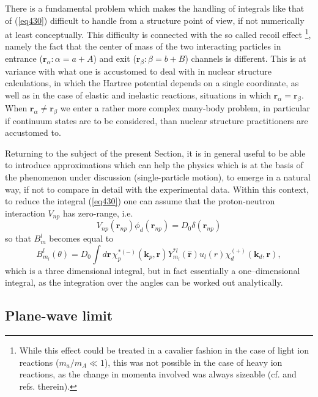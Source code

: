 There is a fundamental problem which makes the handling of integrals like that of (\ref{eq430}) difficult to handle from a structure point of view, if not numerically at least conceptually. This difficulty is connected with the so called recoil effect \footnote{While this effect could be treated in a cavalier fashion in the case of light ion reactions ($m_a/m_A\ll 1$), this was not possible in the case of heavy ion reactions, as the change in momenta involved was always sizeable (cf. \citet{Broglia:04a} and refs. therein).}, namely the fact that the center of mass of the two interacting particles in entrance ($\mathbf r_{\alpha}: \alpha=a+A$) and exit  ($\mathbf r_{\beta}: \beta=b+B$) channels is different. This is at variance with what one is accustomed to deal with in nuclear structure calculations, in which the Hartree potential depends on a single coordinate, as well as in the case of elastic and inelastic reactions, situations in which $\mathbf r_{\alpha}=\mathbf r_{\beta}$. When $\mathbf r_{\alpha}\neq\mathbf r_{\beta}$ we enter a rather more complex many-body problem, in particular if continuum states are to be considered, than nuclear structure practitioners are accustomed to.
 
 

 
 
 Returning to the subject of the present Section, it is in general useful to be able to introduce approximations which can help the physics which is at the basis of the phenomenon under discussion (single-particle motion), to emerge in a natural way, if not to compare in detail with the experimental data. 
Within this context, to reduce the integral (\ref{eq430}) one can assume that the proton-neutron interaction $V_{np}$ has zero-range, i.e.
\begin{equation}\label{eqC6AppE15}
 V_{np}(\mathbf r_{np})\phi_d(\mathbf r_{np})=D_0 \delta(\mathbf r_{np})
\end{equation}
so that  $B_{m}^l$ becomes equal to
\begin{equation}\label{eqC6E16}
B_{m_l}^l(\theta)=D_0 \int d\mathbf r\, \chi^{* (-)}_p(\mathbf k_p,\mathbf r) Y_{m_l}^{*l}(\hat {\mathbf r}) u_{l}(r)
\chi^{(+)}_d(\mathbf k_d,\mathbf r),
\end{equation}
which is  a three dimensional integral, but in fact essentially a one--dimensional integral, as the integration over the angles can be worked out analytically.


\subsection{Plane-wave limit}


